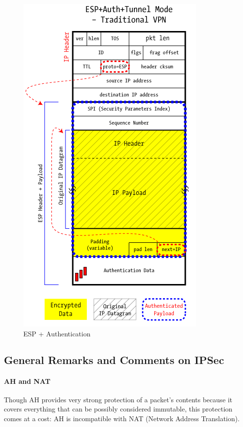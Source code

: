 \documentclass[12pt]{article}
\begin{document}
\begin{figure}
  \centering
  \includegraphics[scale = 0.5]{VPN.png}
  \caption{ESP + Authentication}
 \end{figure}

\subsection{General Remarks and Comments on IPSec}
\paragraph*{AH and NAT}
Though AH provides very strong protection of a packet's contents because it covers everything that can be possibly considered immutable, this protection comes at a cost: AH is incompatible with NAT (Network Address Translation).
 
\end{document}
